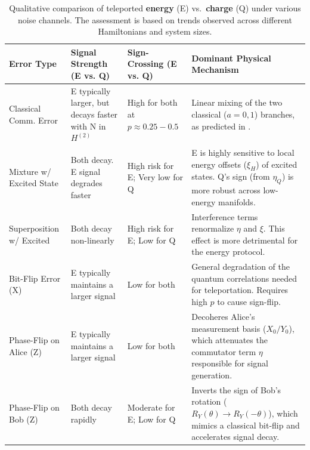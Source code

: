 \begin{table}[t]
\small
\centering
\caption{Qualitative comparison of teleported \textbf{energy} (E) vs.\ \textbf{charge} (Q) under various noise channels. The assessment is based on trends observed across different Hamiltonians and system sizes.}
\label{tab:noise-summary-improved}
\begin{tabularx}{\textwidth}{@{} l >{\hsize=0.8\hsize}X >{\hsize=0.8\hsize}X >{\hsize=1.4\hsize}X @{}}
\toprule
\textbf{Error Type} & \textbf{Signal Strength (E vs. Q)} & \textbf{Sign-Crossing (E vs. Q)} & \textbf{Dominant Physical Mechanism} \\
\midrule
Classical Comm. Error & E typically larger, but decays faster with N in $H^{(2)}$ & High for both at $p \approx 0.25-0.5$ & Linear mixing of the two classical ($a=0, 1$) branches, as predicted in \cite{QKDbyQET}. \\
\addlinespace
Mixture w/ Excited State & Both decay. E signal degrades faster & High risk for E; Very low for Q & E is highly sensitive to local energy offsets ($\xi_H$) of excited states. Q's sign (from $\eta_Q$) is more robust across low-energy manifolds. \\
\addlinespace
Superposition w/ Excited & Both decay non-linearly & High risk for E; Low for Q & Interference terms renormalize $\eta$ and $\xi$. This effect is more detrimental for the energy protocol. \\
\addlinespace
Bit-Flip Error (X) & E typically maintains a larger signal & Low for both & General degradation of the quantum correlations needed for teleportation. Requires high $p$ to cause sign-flip. \\
\addlinespace
Phase-Flip on Alice (Z) & E typically maintains a larger signal & Low for both & Decoheres Alice's measurement basis ($X_0/Y_0$), which attenuates the commutator term $\eta$ responsible for signal generation. \\
\addlinespace
Phase-Flip on Bob (Z) & Both decay rapidly & Moderate for E; Low for Q & Inverts the sign of Bob's rotation ($R_Y(\theta) \to R_Y(-\theta)$), which mimics a classical bit-flip and accelerates signal decay. \\
\bottomrule
\end{tabularx}
\end{table}

